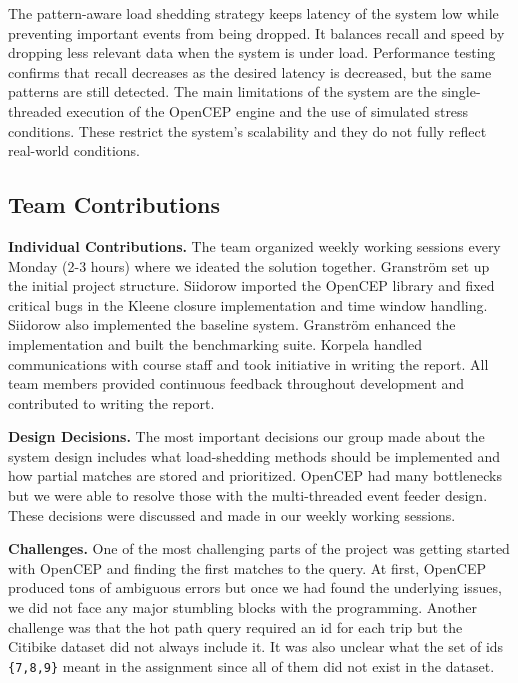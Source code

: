 \documentclass[sigconf]{acmart}
\begin{document}
The pattern-aware load shedding strategy keeps latency of the system low while preventing important events from being dropped. It balances recall and speed by dropping less relevant data when the system is under load. Performance testing confirms that recall decreases as the desired latency is decreased, but the same patterns are still detected. The main limitations of the system are the single-threaded execution of the OpenCEP engine and the use of simulated stress conditions. These restrict the system's scalability and they do not fully reflect real-world conditions.

\subsection*{Team Contributions}

\textbf{Individual Contributions.} The team organized weekly working sessions every Monday (2-3 hours) where we ideated the solution together. Granström set up the initial project structure. Siidorow imported the OpenCEP library and fixed critical bugs in the Kleene closure implementation and time window handling. Siidorow also implemented the baseline system. Granström enhanced the implementation and built the benchmarking suite. Korpela handled communications with course staff and took initiative in writing the report. All team members provided continuous feedback throughout development and contributed to writing the report.

\textbf{Design Decisions.} The most important decisions our group made about the system design includes what load-shedding methods should be implemented and how partial matches are stored and prioritized. OpenCEP had many bottlenecks but we were able to resolve those with the multi-threaded event feeder design. These decisions were discussed and made in our weekly working sessions.

\textbf{Challenges.} One of the most challenging parts of the project was getting started with OpenCEP and finding the first matches to the query. At first, OpenCEP produced tons of ambiguous errors but once we had found the underlying issues, we did not face any major stumbling blocks with the programming. Another challenge was that the hot path query required an id for each trip but the Citibike dataset did not always include it. It was also unclear what the set of ids \lstinline|{7,8,9}| meant in the assignment since all of them did not exist in the dataset.





\end{document}
